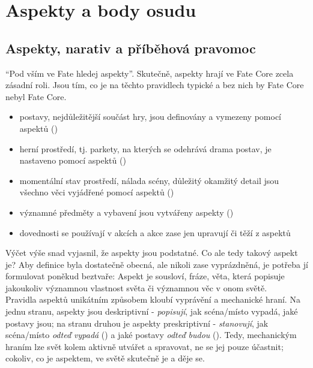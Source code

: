 \documentclass[../main.tex]{subfiles}
\begin{document}
\chapter{Aspekty a body osudu}
\label{chap:aspekty}

\section{Aspekty, narativ a příběhová pravomoc}
\label{sec:aspekty-narativ-pribeh}

``Pod vším ve Fate hledej aspekty''. Skutečně, aspekty hrají ve Fate Core zcela zásadní roli. Jsou tím, co je na těchto pravidlech typické a bez nich by Fate Core nebyl Fate Core.

\begin{itemize}
\item postavy, nejdůležitější součást hry, jsou definovány a vymezeny pomocí aspektů ()
\item herní prostředí, tj. parkety, na kterých se odehrává drama postav, je nastaveno pomocí aspektů ()
\item momentální stav prostředí, nálada scény, důležitý okamžitý detail jsou všechno věci vyjádřené pomocí aspektů ()
\item významné předměty a vybavení jsou vytvářeny aspekty ()
\item dovednosti se používají v akcích a akce zase jen upravují či těží z aspektů
\end{itemize}

Výčet výše snad vyjasnil, že aspekty jsou podstatné. Co ale tedy takový aspekt je? Aby definice byla dostatečně obecná, ale nikoli zase vyprázdněná, je potřeba jí formulovat poněkud beztvaře: Aspekt je sousloví, fráze, věta, která popisuje jakoukoliv významnou vlastnost světa či významnou věc v onom světě. \\

Pravidla aspektů unikátním způsobem kloubí vyprávění a mechanické hraní. Na jednu stranu, aspekty jsou deskriptivní - \emph{popisují}, jak scéna/místo vypadá, jaké postavy jsou; na stranu druhou je aspekty preskriptivní - \emph{stanovují}, jak scéna/místo \emph{odteď vypadá} () a jaké postavy \emph{odteď budou} (). Tedy, mechanickým hraním lze svět kolem aktivně utvářet a spravovat, ne se jej pouze účastnit; cokoliv, co je aspektem, ve světě skutečně je a děje se. \\
\end{document}
